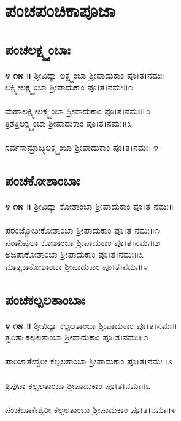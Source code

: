\section{ಪಂಚಪಂಚಿಕಾಪೂಜಾ}
\subsection{ಪಂಚಲಕ್ಷ್ಮ್ಯಂಬಾಃ}
{\bfseries ೪ ೧೫ ॥} ಶ್ರೀವಿದ್ಯಾ ಲಕ್ಷ್ಮ್ಯಂಬಾ ಶ್ರೀಪಾದುಕಾಂ ಪೂ।ತ।ನಮಃ॥\\
ಲಕ್ಷ್ಮೀಲಕ್ಷ್ಮ್ಯಂಬಾ ಶ್ರೀಪಾದುಕಾಂ ಪೂ।ತ।ನಮಃ॥೧\\
\\ಮಹಾಲಕ್ಷ್ಮೀಲಕ್ಷ್ಮ್ಯಂಬಾ ಶ್ರೀಪಾದುಕಾಂ ಪೂ।ತ।ನಮಃ॥೨\\
ತ್ರಿಶಕ್ತಿಲಕ್ಷ್ಮ್ಯಂಬಾ ಶ್ರೀಪಾದುಕಾಂ ಪೂ।ತ।ನಮಃ॥೩\\
 \\ಸರ್ವಸಾಮ್ರಾಜ್ಯಲಕ್ಷ್ಮ್ಯಂಬಾ ಶ್ರೀಪಾದುಕಾಂ ಪೂ।ತ।ನಮಃ॥೪
\subsection{ಪಂಚಕೋಶಾಂಬಾಃ}
{\bfseries ೪ ೧೫ ॥} ಶ್ರೀವಿದ್ಯಾ ಕೋಶಾಂಬಾ ಶ್ರೀಪಾದುಕಾಂ ಪೂ।ತ।ನಮಃ॥\\
\\ ಪರಂಜ್ಯೋತಿಃಕೋಶಾಂಬಾ ಶ್ರೀಪಾದುಕಾಂ ಪೂ।ತ।ನಮಃ॥೧\\
 ಪರಾನಿಷ್ಕಲಾ ಕೋಶಾಂಬಾ ಶ್ರೀಪಾದುಕಾಂ ಪೂ।ತ।ನಮಃ॥೨\\
ಅಜಪಾಕೋಶಾಂಬಾ ಶ್ರೀಪಾದುಕಾಂ ಪೂ।ತ।ನಮಃ॥೩\\
 ಮಾತೃಕಾಕೋಶಾಂಬಾ ಶ್ರೀಪಾದುಕಾಂ ಪೂ।ತ।ನಮಃ॥೪
\subsection{ಪಂಚಕಲ್ಪಲತಾಂಬಾಃ}
{\bfseries ೪ ೧೫ ॥} ಶ್ರೀವಿದ್ಯಾ ಕಲ್ಪಲತಾಂಬಾ ಶ್ರೀಪಾದುಕಾಂ ಪೂ।ತ।ನಮಃ॥\\
 ತ್ವರಿತಾ ಕಲ್ಪಲತಾಂಬಾ ಶ್ರೀಪಾದುಕಾಂ ಪೂ।ತ।ನಮಃ॥೧\\
\\ಪಾರಿಜಾತೇಶ್ವರೀ ಕಲ್ಪಲತಾಂಬಾ ಶ್ರೀಪಾದುಕಾಂ ಪೂ।ತ।ನಮಃ॥೨\\
\\ ತ್ರಿಪುಟಾ ಕಲ್ಪಲತಾಂಬಾ ಶ್ರೀಪಾದುಕಾಂ ಪೂ।ತ।ನಮಃ॥೩\\
\\ ಪಂಚಬಾಣೇಶ್ವರೀ ಕಲ್ಪಲತಾಂಬಾ ಶ್ರೀಪಾದುಕಾಂ ಪೂ।ತ।ನಮಃ॥೪
